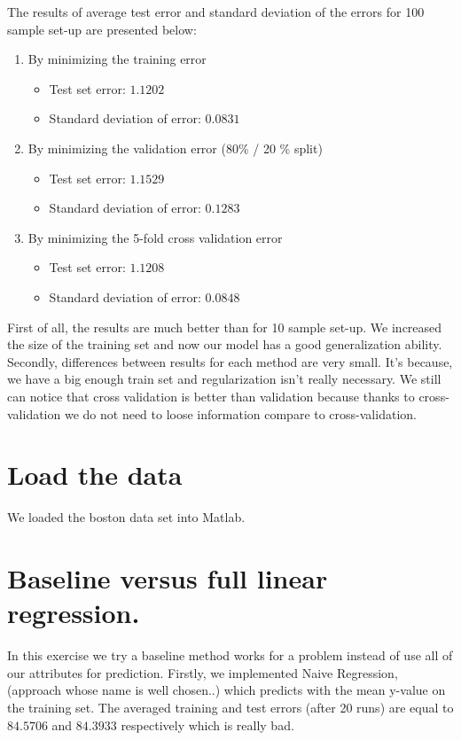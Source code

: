 \documentclass{article} %
\begin{document}
The results of average test error and standard deviation of the errors for 100 sample set-up are presented below:

\begin{enumerate}
\item By minimizing the training error
\begin{itemize}
\item Test set error: $1.1202$
\item Standard deviation of error: $0.0831$
\end{itemize}
\item By minimizing the validation error (80\% / 20 \% split)
\begin{itemize}
\item Test set error: $ 1.1529$
\item Standard deviation of error: $ 0.1283$
\end{itemize}
\item By minimizing the 5-fold cross validation error
\begin{itemize}
\item Test set error: $1.1208$
\item Standard deviation of error: $0.0848$
\end{itemize}
\end{enumerate}
First of all, the results are much better than for 10 sample set-up. We increased the size of the training set and now our model has a good generalization ability. Secondly,  differences between results for each method are very small. It's because, we have a big enough train set and regularization isn't really necessary. We still can notice that cross validation is better than validation because thanks to cross-validation we do not need to loose information compare to cross-validation. 

\section{Load the data}
We loaded the boston data set into Matlab.
\section{Baseline versus full linear regression.}
In this exercise we try a baseline method works for a problem instead of use all of our attributes for prediction. Firstly, we implemented Naive Regression, (approach whose name is well chosen..) which predicts with the mean y-value on the training set. The averaged training and test errors (after 20 runs) are equal to $ 84.5706$ and $84.3933$ respectively which is really bad. 
\end{document}
